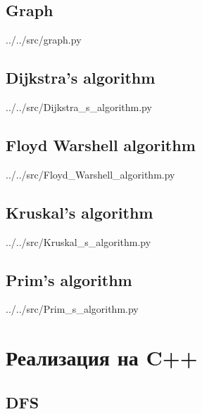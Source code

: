 \newpage

\subsection{Graph}


{../../src/graph.py}

\newpage

\subsection{Dijkstra's algorithm}


{../../src/Dijkstra_s_algorithm.py}

\newpage

\subsection{Floyd Warshell algorithm}


{../../src/Floyd_Warshell_algorithm.py}

\newpage

\subsection{Kruskal's algorithm}


{../../src/Kruskal_s_algorithm.py}

\newpage

\subsection{Prim's algorithm}


{../../src/Prim_s_algorithm.py}

\newpage


\section{Реализация на C++}

\newpage

\subsection{DFS}


